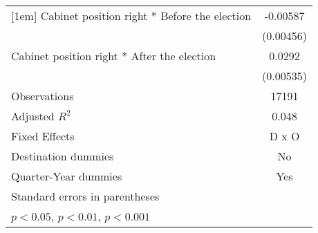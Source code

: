 \begin{table}[htbp]
\begin{tabular}{l*{1}{c}}
[1em]
Cabinet position right * Before the election&    -0.00587         \\
                    &   (0.00456)         \\
[1em]
Cabinet position right * After the election&      0.0292\sym{***}\\
                    &   (0.00535)         \\
\hline
Observations        &       17191         \\
Adjusted \(R^{2}\)  &       0.048         \\
Fixed Effects       &       D x O         \\
Destination dummies &          No         \\
Quarter-Year dummies&         Yes         \\
\hline\hline
\multicolumn{2}{l}{\footnotesize Standard errors in parentheses}\\
\multicolumn{2}{l}{\footnotesize \sym{*} \(p<0.05\), \sym{**} \(p<0.01\), \sym{***} \(p<0.001\)}\\
\end{tabular}
\end{table}
